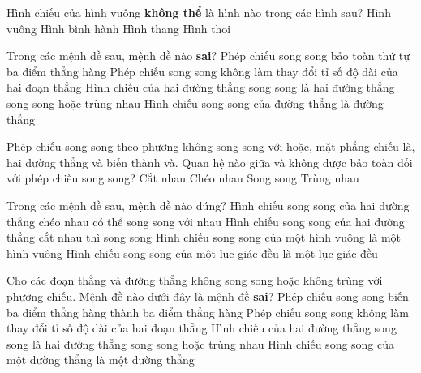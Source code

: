 \begin{ex}%
	Hình  chiếu của hình vuông \textbf{không thể} là hình nào trong các hình sau?
	 \choice
		{Hình vuông} 
		{Hình  bình hành}
		{\True Hình thang} 
		{Hình  thoi}
\end{ex}

\begin{ex}%
	Trong các mệnh đề sau, mệnh  đề nào \textbf{sai}?
	 \choice
		{Phép chiếu song song bảo toàn thứ tự ba điểm thẳng  hàng}
		{\True  Phép chiếu song song không làm thay đổi tỉ số độ dài của hai đoạn thẳng}
		{Hình chiếu của hai đường  thẳng song song là hai đường thẳng song song hoặc trùng nhau}
		{Hình  chiếu song song của đường thẳng là đường thẳng}
\end{ex}

\begin{ex}%
	Phép chiếu song song theo phương không song song với hoặc, mặt phẳng chiếu là, hai đường thẳng và biến thành và. Quan hệ  nào giữa và không được bảo toàn đối với phép chiếu song song?
	\choice 
		 {Cắt nhau}
		{\True Chéo nhau} 
		{Song song} 
		{Trùng  nhau}
\end{ex}

\begin{ex}%
	Trong các mệnh đề sau, mệnh đề nào đúng? 
	 \choice
		{\True Hình chiếu song song của hai đường thẳng chéo nhau có thể song song với  nhau}
		{Hình chiếu song song của hai đường thẳng cắt nhau thì song song} 
		{Hình chiếu song song của một hình vuông  là một hình vuông}
		{Hình chiếu song song của một lục giác đều là  một lục giác đều}
	\loigiai{ 
	 }
\end{ex}

\begin{ex}%
	Cho các đoạn thẳng và đường thẳng không  song song hoặc không trùng với phương chiếu. Mệnh đề nào dưới đây là mệnh đề \textbf{sai}?
	 \choice
		{Phép chiếu song song biến  ba điểm thẳng hàng thành ba điểm thẳng hàng}
		{\True Phép chiếu song song không làm thay đổi tỉ số độ dài của hai đoạn thẳng} 
		{ Hình chiếu của hai  đường thẳng song song là hai đường thẳng song song hoặc trùng nhau}
		{Hình chiếu song song của một đường thẳng là một đường  thẳng}
\end{ex}

